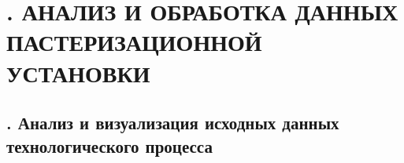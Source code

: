 \setcounter{chaptercntr}{3}

\sectionbreak \section*{
  \gostTitleFont
  \redline
  \thechaptercntr .
  АНАЛИЗ И ОБРАБОТКА ДАННЫХ ПАСТЕРИЗАЦИОННОЙ УСТАНОВКИ
}

\subtitlespace

\subsection*{ 
  \gostTitleFont
  \redline
  \thechaptercntr .\thesubchaptercntr \spc
  Анализ и визуализация исходных данных технологического процесса
} \addtocounter{subchaptercntr}{1}

\titlespace

